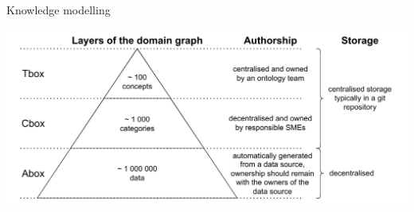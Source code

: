 \begin{frame}[noframenumbering]{Knowledge modelling}

        \begin{center}
            \includegraphics[scale=0.5]{images/TboxAboxCboxLayers.pdf} 
        \end{center}

\end{frame}





